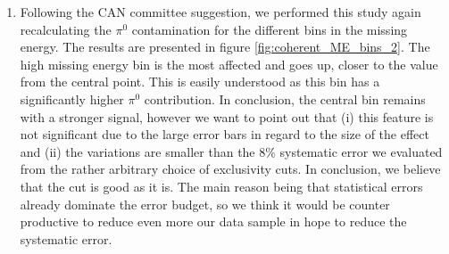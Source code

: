 \begin{enumerate}
\begin{enumerate}
 \item Following the CAN committee suggestion, we performed this study again
    recalculating the $\pi^0$ contamination for the different bins in the 
    missing energy. The results are presented in figure 
    \ref{fig:coherent_ME_bins_2}. The high missing energy bin is the
    most affected and goes up, closer to the value from the central point.    
    This is easily understood as this bin has a significantly higher $\pi^0$
    contribution. In conclusion, the central bin remains with a stronger 
    signal, however we want to point out that (i) this feature is not significant 
    due to the large error bars in regard to the size of the effect and 
    (ii) the variations are smaller than the 8\% systematic error we evaluated 
    from the rather arbitrary choice of exclusivity cuts. In conclusion, we
    believe that the cut is good as it is. The main reason being that 
    statistical errors already dominate the error budget, so we think it
    would be counter productive to reduce even more our data sample in hope to
    reduce the systematic error.
   

\end{enumerate}
\end{enumerate}
